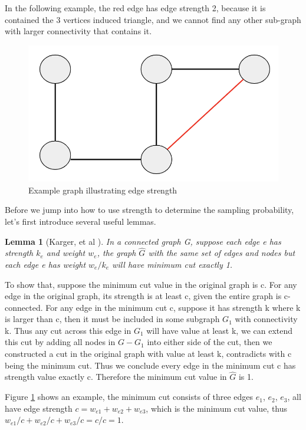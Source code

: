 \documentclass{article}
\newtheorem{lemma}{Lemma}
\begin{document}
In the following example, the red edge has edge strength 2, because it is contained the 3 vertices induced triangle, and we cannot find any other sub-graph with larger connectivity that contains it.

\begin{figure}[h!]
\centering
\includegraphics[scale=0.4]{images/strength.png}
\caption{Example graph illustrating edge strength}
\label{fig:ex_strong}
\end{figure}

Before we jump into how to use strength to determine the sampling probability, let's first introduce several useful lemmas. 

\begin{lemma}[Karger, et al \cite{benczur2015randomized}] \label{min_cut_exact_1}
In a connected graph G, suppose each edge e has strength $k_e$ and weight $w_e$, the graph $\hat{G}$ with the same set of edges and nodes but each edge e has weight $w_e/k_e$ will have minimum cut exactly 1.
\end{lemma}

To show that, suppose the minimum cut value in the original graph is c. For any edge in the original graph, its strength is at least c, given the entire graph is c-connected. For any edge in the minimum cut c, suppose it has strength k where k is larger than c, then it must be included in some subgraph $G_1$ with connectivity k. Thus any cut across this edge in $G_1$ will have value at least k, we can extend this cut by adding all nodes in $G - G_1$ into either side of the cut, then we constructed a cut in the original graph with value at least k, contradicts with c being the minimum cut. Thus we conclude every edge in the minimum cut c has strength value exactly c. 
Therefore the minimum cut value in $\hat{G}$ is 1. 

Figure \ref{fig:ex_strong} shows an example, the minimum cut consists of three edges $e_1$, $e_2$, $e_3$, all have edge strength $c = w_{e1} + w_{e2} + w_{e3}$, which is the minimum cut value, thus $w_{e1}/c + w_{e2}/c + w_{e3}/c = c/c = 1$.
\end{document}
